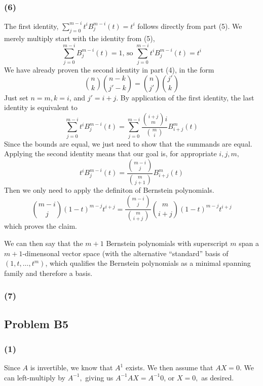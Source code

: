 \documentclass{article}
\begin{document}
\subsubsection{(6)}
The first identity, $\displaystyle{\sum_{j=0}^{m-i}t^iB_j^{m-i}(t)} = t^i$ follows
directly from part (5). We merely multiply start with the identity from (5),
\[ \sum_{j=0}^{m-i}B^{m-i}_j(t) = 1 \textrm{, so }
\sum_{j=0}^{m-i}t^iB^{m-i}_j(t)=t^i \]
We have already proven the second identity in part (4), in the form 
\[\binom{n}{k}\binom{n-k}{j'-k} = \binom{n}{j'}\binom{j'}{k}\]
Just set $n = m, k = i$, and $j' = i + j$.
\medskip
By application of the first identity, the last identity is equivalent to
\[\sum_{j=0}^{m-i}t^iB_j^{m-i}(t) =
\sum_{j=0}^{m-i}\frac{\binom{i+j}{m}{i}}{\binom{m}{i}}B_{i+j}^m(t)\]
Since the bounds are equal, we just need to show that the summands are equal.
Applying the second identity means that our goal is, for appropriate $i,j,m,$
\[t^iB_j^{m-i}(t) = \frac{\binom{m-i}{j}}{\binom{m}{j+1}}B_{i+j}^m(t)\]
Then we only need to apply the definiton of Bernstein polynomials.
\[\binom{m-i}{j}(1-t)^{m-j}t^{i+j} =
\frac{\binom{m-i}{j}}{\binom{m}{i+j}}\binom{m}{i+j}(1-t)^{m-j}t^{i+j}\]
which proves the claim.

\medskip
We can then say that the $m + 1$ Bernstein polynomials with superscript $m$ span
a $m+1$-dimensonal vector space (with the alternative ``standard''
basis of $(1,t,\dots,t^m)$, which qualifies the Bernstein polynomials as a
minimal spanning family and therefore a basis.

\subsubsection{(7)}

\subsection{Problem B5}
\subsubsection{(1)}
Since $A$ is invertible, we know that $A^{1}$ exists.
We then assume that $AX = 0.$ We can left-multiply by $A^{-1},$ giving us
$A^{-1}AX =  A^{-1}0$, or $X = 0,$ as desired.
\end{document}
